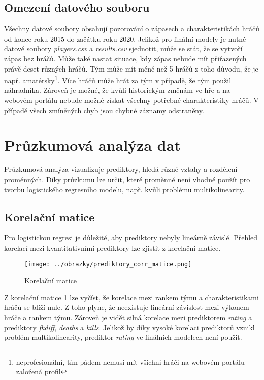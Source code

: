 \newpage
\subsection{Omezení datového souboru}
Všechny datové soubory obsahují pozorování o zápasech a charakteristikách hráčů od konce roku 2015 do začátku roku 2020. Jelikož pro finální modely je nutné datové soubory
\textit{players.csv} a \textit{results.csv} sjednotit, může se stát, že se vytvoří zápas bez hráčů. Může také nastat situace, kdy zápas nebude mít přiřazených právě 
deset různých hráčů. Tým může mít méně než 5 hráčů z toho důvodu, že je např.
amatérsky\footnote{neprofesionální, tím pádem nemusí mít všichni hráči na webovém portálu založená profil}. Více hráčů může hrát za tým v případě, že tým použil náhradníka.
Zároveň je možné, že kvůli historickým změnám ve hře a na webovém portálu nebude možné získat všechny potřebné charakteristiky hráčů. V případě všech zmíněných chyb jsou
chybné záznamy odstraněny.


\newpage
\section{Průzkumová analýza dat}
Průzkumová analýza vizualizuje prediktory, hledá různé vztahy a rozdělení proměnných. Díky průzkumu lze určit, které proměnné není vhodné použít pro tvorbu
logistického regresního modelu, např. kvůli problému multikolinearity.

\subsection{Korelační matice}
Pro logistickou regresi je důležité, aby prediktory nebyly lineárně závislé. Přehled korelací mezi kvantitativními prediktory lze zjistit z korelační matice.

\begin{figure}[H]
    \centering
    \texttt{[image: ../obrazky/prediktory\_corr\_matice.png]}
    \caption{Korelační matice} 
    \label{fig:korelacni_matice}
\end{figure}

Z korelační matice \ref{fig:korelacni_matice} lze vyčíst, 
že korelace mezi rankem týmu a charakteristikami hráčů se blíží nule. Z toho plyne, že neexistuje lineární závislost mezi výkonem hráče a 
rankem týmu. Zároveň je vidět silná korelace mezi prediktorem \textit{rating} a prediktory \textit{fkdiff}, \textit{deaths} a \textit{kills}.
Jelikož by díky vysoké korelaci prediktorů vznikl problém multikolinearity, prediktor \textit{rating} ve finálních modelech není použit.


